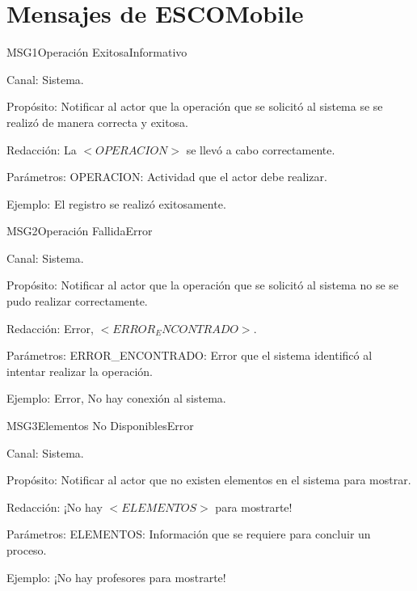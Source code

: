 \section{Mensajes de ESCOMobile}

\begin{mensaje}{MSG1}{Operación Exitosa}{Informativo}
	\item[Canal:] Sistema.
	\item[Propósito:] Notificar al actor que la operación que se solicitó al sistema se se realizó de
	manera correcta y exitosa. 
	\item[Redacción:] La $<OPERACION>$ se llevó a cabo correctamente.
	\item[Parámetros:] OPERACION: Actividad que el actor debe realizar.
	\item[Ejemplo:] El registro se realizó exitosamente.
\end{mensaje}

\begin{mensaje}{MSG2}{Operación Fallida}{Error}
	\item[Canal:] Sistema.
	\item[Propósito:] Notificar al actor que la operación que se solicitó al sistema no se se pudo 
	realizar correctamente.
	\item[Redacción:] Error, $<ERROR_ENCONTRADO>$.
	\item[Parámetros:] ERROR\_ENCONTRADO: Error que el sistema identificó al intentar realizar 
	la operación.
	\item[Ejemplo:] Error, No hay conexión al sistema.
\end{mensaje}

\begin{mensaje}{MSG3}{Elementos No Disponibles}{Error}
	\item[Canal:] Sistema.
    \item[Propósito:] Notificar al actor que no existen elementos en el sistema para mostrar.
    \item[Redacción:] ¡No hay $<ELEMENTOS>$ para mostrarte!
    \item[Parámetros:] ELEMENTOS: Información que se requiere para concluir un proceso.
    \item[Ejemplo:] ¡No hay profesores para mostrarte!
\end{mensaje}

